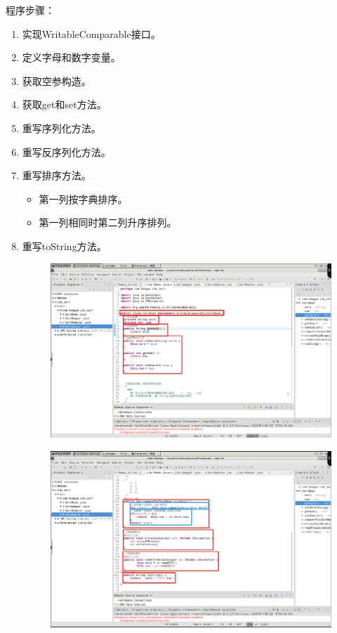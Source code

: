 \documentclass {article}
\begin{document}
				程序步骤：
				\begin{enumerate}
					\item 实现WritableComparable接口。
					\item 定义字母和数字变量。
					\item 获取空参构造。
					\item 获取get和set方法。
					\item 重写序列化方法。
					\item 重写反序列化方法。
					\item 重写排序方法。
					\begin{itemize}
						\item 第一列按字典排序。
						\item 第一列相同时第二列升序排列。
					\end{itemize}
					\item 重写toString方法。
					\begin{figure}[H]
						\centering
						\includegraphics[width=4.5in]{figures/fig2.png}
					\end{figure}
					\begin{figure}[H]
						\centering
						\includegraphics[width=4.5in]{figures/fig3.png}
					\end{figure}
				\end{enumerate}
			
\end{document}
